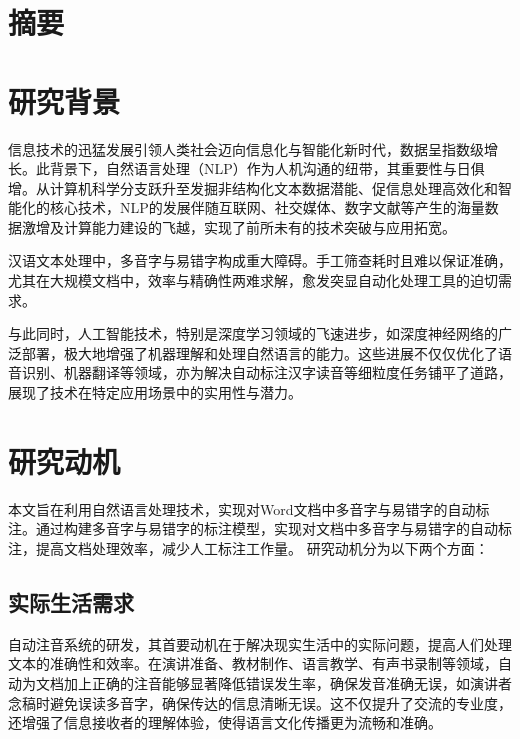 \documentclass[12pt,hyperref,a4paper,UTF8]{ctexart}
\begin{document}
\cover

%
%

\thispagestyle{empty} %

\newpage
\tableofcontents

\newpage

\section{摘要}
\section{研究背景}
信息技术的迅猛发展引领人类社会迈向信息化与智能化新时代，数据呈指数级增长。此背景下，自然语言处理（NLP）作为人机沟通的纽带，其重要性与日俱增。从计算机科学分支跃升至发掘非结构化文本数据潜能、促信息处理高效化和智能化的核心技术，NLP的发展伴随互联网、社交媒体、数字文献等产生的海量数据激增及计算能力建设的飞越，实现了前所未有的技术突破与应用拓宽。

汉语文本处理中，多音字与易错字构成重大障碍。手工筛查耗时且难以保证准确，尤其在大规模文档中，效率与精确性两难求解，愈发突显自动化处理工具的迫切需求。

与此同时，人工智能技术，特别是深度学习领域的飞速进步，如深度神经网络的广泛部署，极大地增强了机器理解和处理自然语言的能力。这些进展不仅仅优化了语音识别、机器翻译等领域，亦为解决自动标注汉字读音等细粒度任务铺平了道路，展现了技术在特定应用场景中的实用性与潜力。
\section{研究动机}
本文旨在利用自然语言处理技术，实现对Word文档中多音字与易错字的自动标注。通过构建多音字与易错字的标注模型，实现对文档中多音字与易错字的自动标注，提高文档处理效率，减少人工标注工作量。
研究动机分为以下两个方面：
\subsection{实际生活需求}
自动注音系统的研发，其首要动机在于解决现实生活中的实际问题，提高人们处理文本的准确性和效率。在演讲准备、教材制作、语言教学、有声书录制等领域，自动为文档加上正确的注音能够显著降低错误发生率，确保发音准确无误，如演讲者念稿时避免误读多音字，确保传达的信息清晰无误。这不仅提升了交流的专业度，还增强了信息接收者的理解体验，使得语言文化传播更为流畅和准确。
\end{document}
